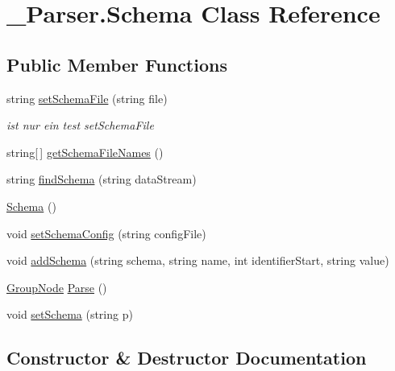 \hypertarget{class__1920_parser_1_1_schema}{}\section{\+\_\+Parser.\+Schema Class Reference}
\label{class__1920_parser_1_1_schema}
\subsection*{Public Member Functions}
\begin{DoxyCompactItemize}
\item 
string \hyperlink{class__1920_parser_1_1_schema_abd7eba55dee6bec1ccfaa6e046ff401a}{set\+Schema\+File} (string file)
\begin{DoxyCompactList}\small\item\em ist nur ein test set\+Schema\+File \end{DoxyCompactList}\item 
string\mbox{[}$\,$\mbox{]} \hyperlink{class__1920_parser_1_1_schema_a4b93342ab889af0b36734ecea7a5d219}{get\+Schema\+File\+Names} ()
\item 
string \hyperlink{class__1920_parser_1_1_schema_a2b3076000e2adeeba61d600748b9ca1f}{find\+Schema} (string data\+Stream)
\item 
\hyperlink{class__1920_parser_1_1_schema_a5aa7610a9a30808e4457ddeff0f7aa5d}{Schema} ()
\item 
void \hyperlink{class__1920_parser_1_1_schema_a75aff2be2a6f5a2655f0b7fb29513061}{set\+Schema\+Config} (string config\+File)
\item 
void \hyperlink{class__1920_parser_1_1_schema_a433f90bb7ab952649ee56ceb84405c95}{add\+Schema} (string schema, string name, int identifier\+Start, string value)
\item 
\hyperlink{class__1920_parser_1_1_group_node}{Group\+Node} \hyperlink{class__1920_parser_1_1_schema_a970c7c326e6f505c5798392da0fa0385}{Parse} ()
\item 
void \hyperlink{class__1920_parser_1_1_schema_a82297f55ef46f1aa5a98d654b21fafec}{set\+Schema} (string p)
\end{DoxyCompactItemize}


\subsection{Constructor \& Destructor Documentation}
